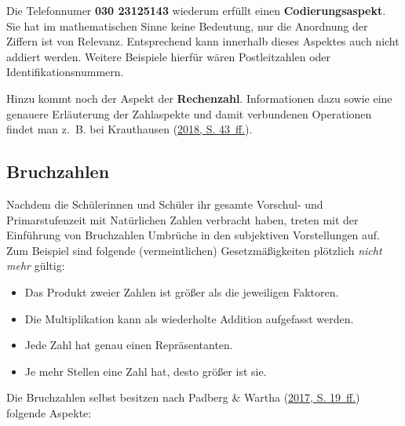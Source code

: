 \documentclass[
]{scrbook}
\providecommand{\tightlist}{%
  \setlength{\itemsep}{0pt}\setlength{\parskip}{0pt}}
\theoremstyle{definition}
\theoremstyle{definition}
\theoremstyle{definition}
\theoremstyle{definition}
\theoremstyle{remark}
\begin{document}
Die Telefonnumer \textbf{030 23125143} wiederum erfüllt einen \textbf{Codierungsaspekt}. Sie hat im mathematischen Sinne keine Bedeutung, nur die Anordnung der Ziffern ist von Relevanz. Entsprechend kann innerhalb dieses Aspektes auch nicht addiert werden. Weitere Beispiele hierfür wären Postleitzahlen oder Identifikationsnummern.

Hinzu kommt noch der Aspekt der \textbf{Rechenzahl}. Informationen dazu sowie eine genauere Erläuterung der Zahlaspekte und damit verbundenen Operationen findet man z.~B. bei Krauthausen (\protect\hyperlink{ref-Krauthausen:2018}{2018, S. 43~ff.}).

\hypertarget{bruchzahlen}{%
\subsection{Bruchzahlen}\label{bruchzahlen}}

Nachdem die Schülerinnen und Schüler ihr gesamte Vorschul- und Primarstufenzeit mit Natürlichen Zahlen verbracht haben, treten mit der Einführung von Bruchzahlen Umbrüche in den subjektiven Vorstellungen auf. Zum Beispiel sind folgende (vermeintlichen) Gesetzmäßigkeiten plötzlich \emph{nicht mehr} gültig:

\begin{itemize}
\tightlist
\item
  Das Produkt zweier Zahlen ist größer als die jeweiligen Faktoren.
\item
  Die Multiplikation kann als wiederholte Addition aufgefasst werden.
\item
  Jede Zahl hat genau einen Repräsentanten.
\item
  Je mehr Stellen eine Zahl hat, desto größer ist sie.
\end{itemize}

Die Bruchzahlen selbst besitzen nach Padberg \& Wartha (\protect\hyperlink{ref-Padberg:2017}{2017, S. 19~ff.}) folgende Aspekte:
\end{document}
